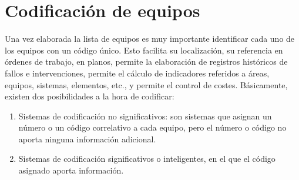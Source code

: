 \section{Codificación de equipos}

Una vez elaborada la lista de equipos es muy importante identificar cada
uno de los equipos con un código único. Esto facilita su localización, su referencia en órdenes de trabajo, en planos, permite la elaboración de registros históricos de fallos e intervenciones, permite el cálculo de indicadores referidos
a áreas, equipos, sistemas, elementos, etc., y permite el control de costes.
Básicamente, existen dos posibilidades a la hora de codificar:
\begin{enumerate}
\item Sistemas de codificación no significativos: son sistemas que asignan un número o un código correlativo a cada equipo, pero el número o código no aporta ninguna información adicional.
    \item  Sistemas de codificación significativos o inteligentes, en el que el código asignado aporta información.
\end{enumerate}


